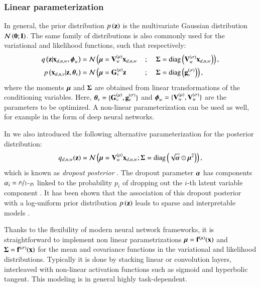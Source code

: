 \subsubsection{Linear parameterization}
In general, the prior distribution $p\left(\mathbf{z}\right)$ is the  multivariate Gaussian distribution $\mathcal{N}\left(\mathbf{0};\mathbf{I}\right)$.
The same family of distributions is also commonly used for the variational and likelihood functions, such that respectively:
\begin{alignat}{4}
\label{eq:encoder}
q\left(\mathbf{z}|\mathbf{x}_{d,n,w}, \boldsymbol{\phi}_w\right)  &= \mathcal{N} \left( \boldsymbol{\mu} = \mathbf{V}_w^{(\mu)} \mathbf{x}_{d,n,w} \right. &&{}; &&\left.\boldsymbol{\Sigma} = \operatorname{diag}\left(\mathbf{V}_w^{(\sigma)} \mathbf{x}_{d,n,w}\right) \right), \\
\label{eq:decoder}
p\left(\mathbf{x}_{d,n,v}|\mathbf{z},\boldsymbol{\theta}_v\right) &= \mathcal{N} \left( \boldsymbol{\mu} = \mathbf{G}_v^{(\mu)} \mathbf{z} \right. &&{} ; &&\left.\boldsymbol{\Sigma} = \operatorname{diag}\left(\mathbf{g}_v^{(\sigma)}\right) \right),
\end{alignat}
where the moments $\boldsymbol{\mu}$ and $\boldsymbol{\Sigma}$ are obtained from linear transformations of the conditioning variables.
Here, $\boldsymbol{\theta}_v = \{\mathbf{G}_v^{(\mu)}, \mathbf{g}_v^{(\sigma)}\}$ and $\boldsymbol{\phi}_w=\{\mathbf{V}_w^{(\mu)}, \mathbf{V}_w^{(\sigma)}\}$ are the parameters to be optimized.
A non-linear parameterization can be used as well, for example in the form of deep neural networks.

In \cite{Antelmi2019} we also introduced the following alternative parameterization for the posterior distribution:
\begin{equation}
\label{eq:dropout_posterior}
    q_{d,n,w}(\mathbf{z}) = \mathcal{N}\left(\boldsymbol{\mu} = \mathbf{V}_w^{(\mu)} \mathbf{x}_{d,n,w};\boldsymbol{\Sigma} = \operatorname{diag}\left(\sqrt{\boldsymbol{\alpha}} \odot \boldsymbol{\mu}^2\right)\right),
\end{equation}
which is known as \textit{dropout posterior} \citep{Kingma2015}.
The dropout parameter $\boldsymbol{\alpha}$ has components $\alpha_i = \nicefrac{p_i}{1-p_i}$ linked to the probability $p_i$ of dropping out the $i$-th latent variable component \citep{Wang2013}.
It has been shown that the association of this dropout posterior with a log-uniform prior distribution $p\left(\mathbf{z}\right)$ leads to sparse and interpretable models \citep{Molchanov2017,Garbarino2021}.

Thanks to the flexibility of modern neural network frameworks,
it is straightforward to implement non linear parametrizations $\boldsymbol{\mu} = \mathbf{f}^{(\mu)}(\mathbf{x})$ and $\boldsymbol{\Sigma} = \mathbf{f}^{(\sigma)}(\mathbf{x})$ for the mean and covariance functions in the variational and likelihood distributions.
Typically it is done by stacking linear or convolution layers, interleaved with non-linear activation functions such as sigmoid and hyperbolic tangent.
This modeling is in general highly task-dependent.
